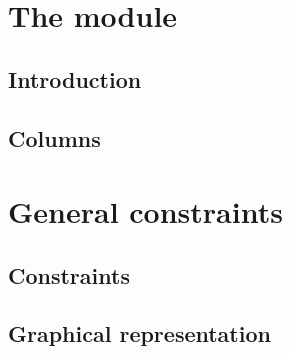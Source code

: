 \section{The \hashDataMod{} module}
%
\subsection{Introduction}                         \label{hash data: introduction}      
\subsection{Columns}                              \label{hash data: columns}           
%
\section{General constraints}
\subsection{Constraints}                          \label{hash data: constraints}       
\subsection{Graphical representation}             \label{hash info: representation}    
